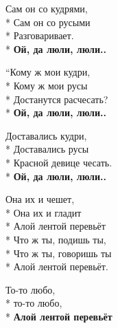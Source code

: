 \medskip

\begin{minipage}{\linewidth}
Сам он со кудрями,\\*
Сам он со русыми\\*
Разговаривает.\\*
\textbf{Ой, да люли, люли..}\\
\end{minipage}\par\medskip\nobreak

\medskip

\begin{minipage}{\linewidth}
“Кому ж мои кудри,\\*
Кому ж мои русы\\*
Достанутся расчесать?\\*
\textbf{Ой, да люли, люли..}\\
\end{minipage}\par\medskip\nobreak

\medskip

\begin{minipage}{\linewidth}
Доставались кудри,\\*
Доставались русы\\*
Красной девице чесать.\\*
\textbf{Ой, да люли, люли..}\\
\end{minipage}\par\medskip\nobreak

\medskip

\begin{minipage}{\linewidth}
Она их и чешет,\\*
Она их и гладит \\*
Алой лентой перевьёт\\*
\hspace*{1.5em}Что ж ты, подишь ты,\\*
\hspace*{1.5em}Что ж ты, говоришь ты\\*
\hspace*{1.5em}Алой лентой перевьёт.\\
\end{minipage}\par\medskip\nobreak

\medskip

\begin{minipage}{\linewidth}
То-то любо,\\*
то-то любо,\\*
\textbf{Алой лентой перевьёт}\\
\end{minipage}\par\medskip\nobreak

